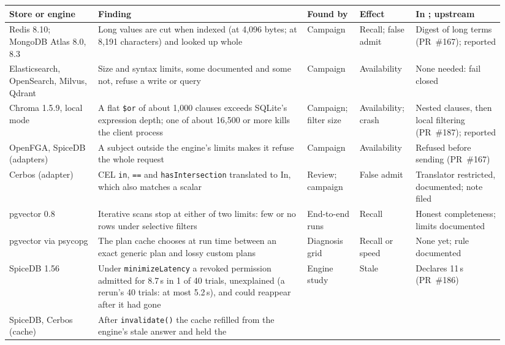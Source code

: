 \begin{table}[tbp]
\centering
\scriptsize
\newcommand{\findrag}{\raggedright}
\setlength{\tabcolsep}{3pt}
\begin{tabular}{@{}p{0.17\linewidth}p{0.4\linewidth}p{0.1\linewidth}p{0.1\linewidth}p{0.17\linewidth}@{}}
\toprule
Store or engine & Finding & Found by & Effect & In \sys{}; upstream \\
\midrule
\findrag Redis 8.10; MongoDB Atlas 8.0, 8.3
 & \findrag Long values are cut when indexed (at 4,096 bytes; at 8,191 characters) and looked up whole
 & \findrag Campaign & \findrag Recall; false admit
 & \findrag Digest of long terms (PR~\#167); reported \tabularnewline
\findrag Elasticsearch, OpenSearch, Milvus, Qdrant
 & \findrag Size and syntax limits, some documented and some not, refuse a write or query
 & \findrag Campaign & \findrag Availability
 & \findrag None needed: fail closed \tabularnewline
\findrag Chroma 1.5.9, local mode
 & \findrag A flat \texttt{\$or} of about 1,000 clauses exceeds SQLite's expression depth; one of about
   16,500 or more kills the client process
 & \findrag Campaign; filter size & \findrag Availability; crash
 & \findrag Nested clauses, then local filtering (PR~\#187); reported \tabularnewline
\findrag OpenFGA, SpiceDB (adapters)
 & \findrag A subject outside the engine's limits makes it refuse the whole request
 & \findrag Campaign & \findrag Availability
 & \findrag Refused before sending (PR~\#167) \tabularnewline
\findrag Cerbos (adapter)
 & \findrag CEL \texttt{in}, \texttt{==} and \texttt{hasIntersection} translated to In, which also matches a
   scalar
 & \findrag Review; campaign & \findrag False admit
 & \findrag Translator restricted, documented; note filed \tabularnewline
\findrag pgvector 0.8
 & \findrag Iterative scans stop at either of two limits: few or no rows under selective filters
 & \findrag End-to-end runs & \findrag Recall
 & \findrag Honest completeness; limits documented \tabularnewline
\findrag pgvector via psycopg
 & \findrag The plan cache chooses at run time between an exact generic plan and lossy custom plans
 & \findrag Diagnosis grid & \findrag Recall or speed
 & \findrag None yet; rule documented \tabularnewline
\findrag SpiceDB 1.56
 & \findrag Under \texttt{minimizeLatency} a revoked permission admitted for 8.7\,s in 1 of 40 trials, unexplained (a
   rerun's 40 trials: at most 5.2\,s), and could reappear after it had gone
 & \findrag Engine study & \findrag Stale
 & \findrag Declares 11\,s (PR~\#186) \tabularnewline
\findrag SpiceDB, Cerbos (cache)
 & \findrag After \texttt{invalidate()} the cache refilled from the engine's stale answer and held the

\end{tabular}
\end{table}
